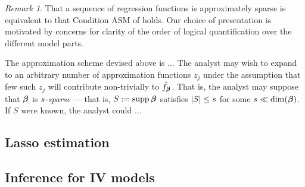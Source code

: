 \documentclass{uwstat572}
\theoremstyle{definition}
\theoremstyle{remark}
\newtheorem{rek}[thm]{Remark}
\newcommand{\Q}{\mathbb{Q}}
\newcommand{\ga}{\alpha}
\newcommand{\gep}{\epsilon}
\newcommand{\gth}{\theta}
\newcommand{\supp}{\mathrm{supp} \,}
\newcommand{\E}{\mathrm{E}}
\newcommand{\bs}[1]{\boldsymbol{#1}}
\numberwithin{equation}{section}
\begin{document}
\begin{rek} That a sequence of regression functions is approximately sparse is equivalent to that Condition ASM of \cite{BCH11} holds. Our choice of presentation is motivated by concerns for clarity of the order of logical quantification over the different model parts. 
\end{rek}


The approximation scheme devised above is ... The analyst may wish to expand to an arbitrary number of approximation functions $z_j$ under the assumption that few such $z_j$ will contribute non-trivially to $\fbhat$. That is, the analyst may suppose that $\regb$ is $\sb$-\emph{sparse} --- that is, $\Sb := \supp \regb$ satisfies $|\Sb| \leq \sb$ for some $\sb \ll \dim(\regb)$. If $S$ were known, the analyst could ...   


%
% 
\subsection{Lasso estimation}






%
%
\subsection{Inference for IV models}
\newcommand{\regt}{\gth}
\newcommand{\regg}{\bs{\gamma}}
\newcommand{\rega}{\bs{\ga}}
\newcommand{\regahat}{\hat{\rega}}
\newcommand{\erfi}{v_i}
\newcommand{\erfc}{v}
\newcommand{\ersc}{\gep}
\newcommand{\sds}{\sd_\ersc}
\newcommand{\sdf}{\sd_\erfc}
\renewcommand{\a}{\bs{a}}
\newcommand{\ahat}{\hat{\a}}
\newcommand{\sdfs}{\sd_{\erfc\ersc}}
\newcommand{\xinst}{\x^\dagger}
\newcommand{\xinsti}{x_i^\dagger}
\newcommand{\kp}{\otimes}
\newcommand{\ainst}{\a^\dagger}
\newcommand{\ainstkpt}{\a^{\dagger\kpt}}
\newcommand{\En}{\mathbb{E}_n}
\renewcommand{\rm}{\bs{\Delta}}
\newcommand{\g}{\bs{g}}
\renewcommand{\Q}{\bs{Q}}
\newcommand{\Om}{\bs{\Omega}}
\newcommand{\EEn}{\bar{\E}}
\newcommand{\kpt}{\kp2}
\end{document}
